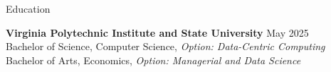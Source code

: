 \begin{rSection}{Education}

    \textbf{Virginia Polytechnic Institute and State University} \hfill {May 2025} \\[0.3em]
    Bachelor of Science, Computer Science, \textit{Option: Data-Centric Computing} \\ 
    Bachelor of Arts, Economics, \textit{Option: Managerial and Data Science}

\end{rSection}
